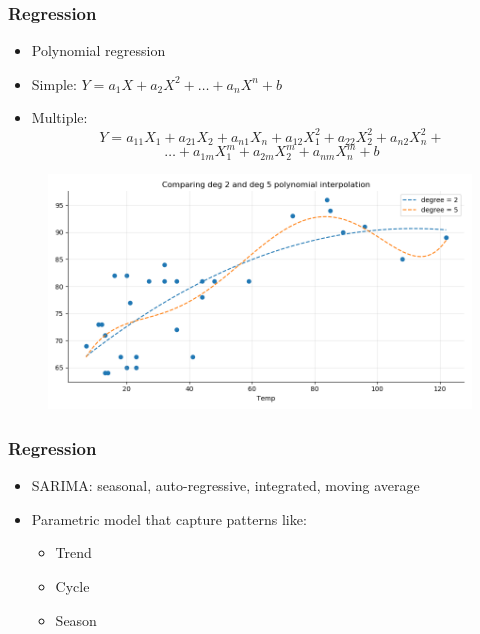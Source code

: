 \begin{frame}\frametitle{Regression}
   \begin{itemize}
      \item Polynomial regression
      \item Simple: $Y = a_1X + a_2X^2 + \dots + a_nX^n +b$
      \item Multiple: $$Y = a_{11}X_1 + a_{21}X_2 + a_{n1}X_n + a_{12}X_1^2 + a_{22}X_2^2 + a_{n2}X_n^2 + $$
                           $$\dots + a_{1m}X_1^m + a_{2m}X_2^m + a_{nm}X_n^m + b$$
   \end{itemize}
   \begin{figure}[H]
      \includegraphics[scale=.35]{../images/illustrations/model_polynomial_regression.png}
   \end{figure}
\end{frame}


\begin{frame}\frametitle{Regression}
   \begin{itemize}
      \item SARIMA: seasonal, auto-regressive, integrated, moving average
      \item Parametric model that capture patterns like:
      \begin{itemize}
         \item Trend
         \item Cycle
         \item Season
      \end{itemize}
   \end{itemize}
\end{frame}


